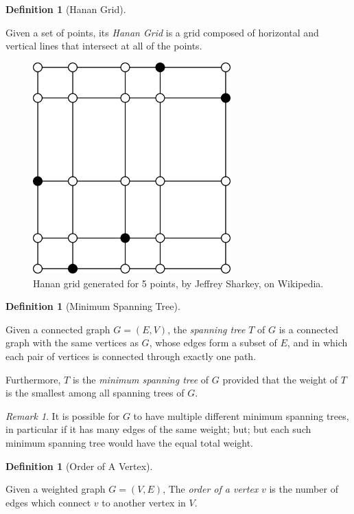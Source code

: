 \documentclass[12pt,letterpaper]{article}
\theoremstyle{definition}\newtheorem{defn}[defncounter]{Definition}
\theoremstyle{remark}\newtheorem*{remark}{Remark}
\begin{document}
\begin{defn}[Hanan Grid]\label{hanangrid_defn}

Given a set of points, its \emph{Hanan Grid} is a grid composed of horizontal and vertical lines that intersect at all of the points.

\begin{figure}[H]
	\centering
	\includegraphics[width=3in]{HananGrid}
	\caption{Hanan grid generated for 5 points, by Jeffrey Sharkey, on Wikipedia.}
	\label{hanangrid_image}
\end{figure}
\end{defn}

\begin{defn}[Minimum Spanning Tree]\label{MST_defn}

Given a connected graph \(G = (E, V)\), the \emph{spanning tree} \(T\) of \(G\) is a connected graph with the same vertices as \(G\), whose edges form a subset of \(E\), and in which each pair of vertices is connected through exactly one path.

Furthermore, \(T\) is the \emph{minimum spanning tree} of \(G\) provided that the weight of \(T\) is the smallest among all
spanning trees of \(G\).

\begin{remark}

It is possible for \(G\) to have multiple different minimum spanning trees, in particular if it has many edges of the same weight; 
but; but each such minimum spanning tree would have the equal total weight.

\end{remark}

\end{defn}


\begin{defn}[Order of A Vertex]\label{vertexorder_defn}

Given a weighted graph \(G = (V, E)\), The \emph{order of a vertex} \(v\) is the number of edges which connect \(v\) to another 
vertex in \(V\).

\end{defn}
\end{document}
